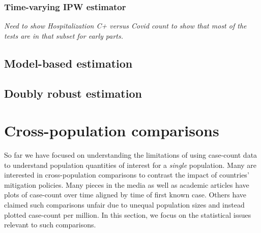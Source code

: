 \documentclass[12pt]{amsart}
\numberwithin{equation}{section}
\theoremstyle{plain}
\begin{document}
\subsubsection{Time-varying IPW estimator}

\emph{Need to show Hospitalization C+ versus Covid count to show that most of the tests are in that subset for early parts.}






\subsection{Model-based estimation}

\subsection{Doubly robust estimation}



\section{Cross-population comparisons}
\label{section:crosspop}
So far we have focused on understanding the limitations of using case-count data to understand population quantities of interest for a \emph{single} population.  Many are interested in cross-population comparisons to contrast the impact of countries' mitigation policies.  Many pieces in the media as well as academic articles have plots of case-count over time aligned by time of first known case.  Others have claimed such comparisons unfair due to unequal population sizes and instead plotted case-count per million.  In this section, we focus on the statistical issues relevant to such comparisons.
\end{document}
